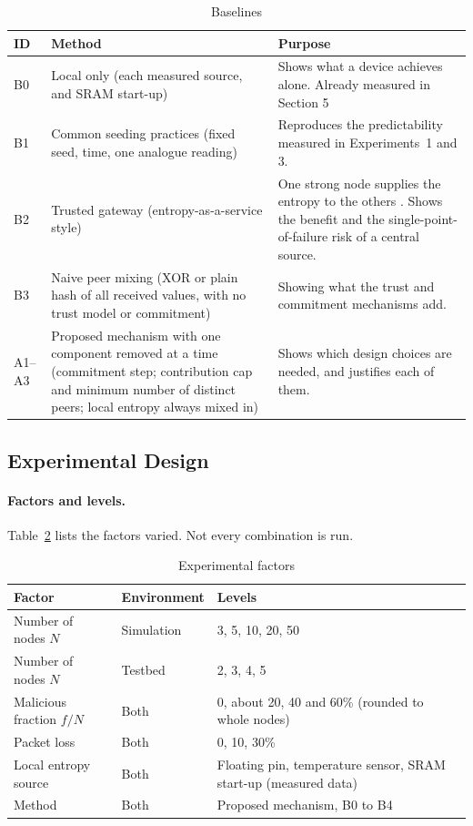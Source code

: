 \documentclass[a4paper, 12pt]{article}
\begin{document}
\begin{table}[htbp]
\centering
\small
\caption{Baselines}
\label{tab:ev_baselines}
\begin{tabularx}{\textwidth}{@{}p{}p{}X@{}}
\toprule
\textbf{ID} & \textbf{Method} & \textbf{Purpose} \\
\midrule
B0 & Local only (each measured source, and SRAM start-up) & Shows what a device achieves alone. Already measured in Section 5 \\
B1 & Common seeding practices (fixed seed, time, one analogue reading) & Reproduces the predictability measured in Experiments~1 and 3. \\
B2 & Trusted gateway (entropy-as-a-service style) & One strong node supplies the entropy to the others \citep{NIST_EaaS}. Shows the benefit and the single-point-of-failure risk of a central source. \\
B3 & Naive peer mixing (XOR or plain hash of all received values, with no trust model or commitment) & Showing what the trust and commitment mechanisms add. \\
A1--A3 & Proposed mechanism with one component removed at a time (commitment step; contribution cap and minimum number of distinct peers; local entropy always mixed in) & Shows which design choices are needed, and justifies each of them. \\
\bottomrule
\end{tabularx}
\end{table}
 
\subsection{Experimental Design}
 
\paragraph{Factors and levels.} Table~\ref{tab:ev_factors} lists the factors varied. Not every combination is run.
 
\begin{table}[htbp]
\centering
\small
\caption{Experimental factors}
\label{tab:ev_factors}
\begin{tabularx}{\textwidth}{@{}p{}p{}X@{}}
\toprule
\textbf{Factor} & \textbf{Environment} & \textbf{Levels} \\
\midrule
Number of nodes $N$ & Simulation & 3, 5, 10, 20, 50 \\
Number of nodes $N$ & Testbed & 2, 3, 4, 5 \\
Malicious fraction $f/N$ & Both & 0, about 20, 40 and 60\% (rounded to whole nodes) \\
Packet loss & Both & 0, 10, 30\% \\
Local entropy source & Both & Floating pin, temperature sensor, SRAM start-up (measured data) \\
Method & Both & Proposed mechanism, B0 to B4 \\
\bottomrule
\end{tabularx}
\end{table}
 
\end{document}
